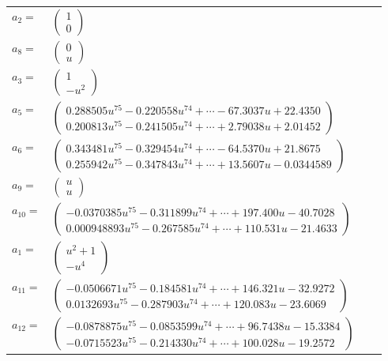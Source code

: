 \documentclass[1p]{elsarticle_modified}
\theoremstyle{definition}
\begin{document}
\begin{tabular}{m{7pt} m{180pt} m{7pt} m{180pt} }
\flushright $a_{2}=$&$\begin{pmatrix}1\\0\end{pmatrix}$ \\
\flushright $a_{8}=$&$\begin{pmatrix}0\\u\end{pmatrix}$ \\
\flushright $a_{3}=$&$\begin{pmatrix}1\\- u^2\end{pmatrix}$ \\
\flushright $a_{5}=$&$\begin{pmatrix}0.288505 u^{75}-0.220558 u^{74}+\cdots-67.3037 u+22.4350\\0.200813 u^{75}-0.241505 u^{74}+\cdots+2.79038 u+2.01452\end{pmatrix}$ \\
\flushright $a_{6}=$&$\begin{pmatrix}0.343481 u^{75}-0.329454 u^{74}+\cdots-64.5370 u+21.8675\\0.255942 u^{75}-0.347843 u^{74}+\cdots+13.5607 u-0.0344589\end{pmatrix}$ \\
\flushright $a_{9}=$&$\begin{pmatrix}u\\u\end{pmatrix}$ \\
\flushright $a_{10}=$&$\begin{pmatrix}-0.0370385 u^{75}-0.311899 u^{74}+\cdots+197.400 u-40.7028\\0.000948893 u^{75}-0.267585 u^{74}+\cdots+110.531 u-21.4633\end{pmatrix}$ \\
\flushright $a_{1}=$&$\begin{pmatrix}u^2+1\\- u^4\end{pmatrix}$ \\
\flushright $a_{11}=$&$\begin{pmatrix}-0.0506671 u^{75}-0.184581 u^{74}+\cdots+146.321 u-32.9272\\0.0132693 u^{75}-0.287903 u^{74}+\cdots+120.083 u-23.6069\end{pmatrix}$ \\
\flushright $a_{12}=$&$\begin{pmatrix}-0.0878875 u^{75}-0.0853599 u^{74}+\cdots+96.7438 u-15.3384\\-0.0715523 u^{75}-0.214330 u^{74}+\cdots+100.028 u-19.2572\end{pmatrix}$ \\

\end{tabular}
\end{document}
